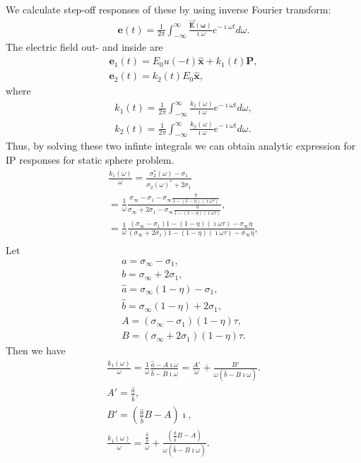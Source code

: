\documentclass[a4paper, 11pt]{article}
\newcommand {\E}{{\vec E}}
\begin{document}
We calculate step-off responses of these by using inverse Fourier transform:
\begin{align*}
	\mathbf{e}(t) = \frac{1}{2\pi}\int_{-\infty}^{\infty}\frac{\mathbf{\E(\omega)}}{\imath\omega}e^{-\imath\omega t} d\omega.
\end{align*}
The electric field out- and inside are
\begin{align*}
	\mathbf{e}_1(t) = E_0u(-t)\mathbf{\hat{x}} + k_1(t)\mathbf{P}, \\
	\mathbf{e}_2(t) = k_2(t)E_0\mathbf{\hat{x}},
\end{align*}
where
\begin{align*}
	k_1(t) = \frac{1}{2\pi}\int_{-\infty}^{\infty}\frac{k_1(\omega)}{\imath\omega}e^{-\imath\omega t} d\omega, \\
	k_2(t) = \frac{1}{2\pi}\int_{-\infty}^{\infty}\frac{k_2(\omega)}{\imath\omega}e^{-\imath\omega t} d\omega.
\end{align*}
Thus, by solving these two infinte integrals we can obtain analytic expression for IP responses for static sphere problem. 
\begin{align*}
	\frac{k_1(\omega)}{\omega}=\frac{\sigma_2^*(\omega)-\sigma_1}{\sigma_2(\omega)^*+2\sigma_1}\\
	=\frac{1}{\omega}\frac{ \sigma_{\infty}-\sigma_1-\sigma_{\infty}\frac{\eta}{1-(1-\eta)(\imath\omega\tau)} }
	                      { \sigma_{\infty}+2\sigma_1-\sigma_{\infty}\frac{\eta}{1-(1-\eta)(\imath\omega\tau)} }, \\
	=\frac{1}{\omega}\frac{ (\sigma_{\infty}-\sigma_1)1-(1-\eta)(\imath\omega\tau)-\sigma_{\infty}\eta }
	                      { (\sigma_{\infty}+2\sigma_1)1-(1-\eta)(\imath\omega\tau)-\sigma_{\infty}\eta }, \\	  
\end{align*}
Let
\begin{align*}
	a = \sigma_{\infty}-\sigma_1, \\
	b = \sigma_{\infty}+2\sigma_1, \\
	\hat{a} = \sigma_{\infty}(1-\eta)-\sigma_1, \\
	\hat{b} = \sigma_{\infty}(1-\eta)+2\sigma_1, \\
	A = (\sigma_{\infty}-\sigma_1)(1-\eta)\tau,  \\
	B = (\sigma_{\infty}+2\sigma_1)(1-\eta)\tau. 
\end{align*}
Then we have
\begin{align*}
	\frac{k_1(\omega)}{\omega}=\frac{1}{\omega}\frac{\hat{a}-A\imath\omega}{\hat{b}-B\imath\omega}
			   				  =\frac{A'}{\omega}+\frac{B'}{\omega(\hat{b}-B\imath\omega)}. \\
	A' = \frac{\hat{a}}{\hat{b}}, \\
	B' = (\frac{\hat{a}}{\hat{b}}B-A)\imath, \\
	\frac{k_1(\omega)}{\omega}=\frac{\frac{\hat{a}}{\hat{b}}}{\omega}+\frac{(\frac{\hat{a}}{\hat{b}}B-A)}{\omega(\hat{b}-B\imath\omega)}. \\
\end{align*}
\end{document}
